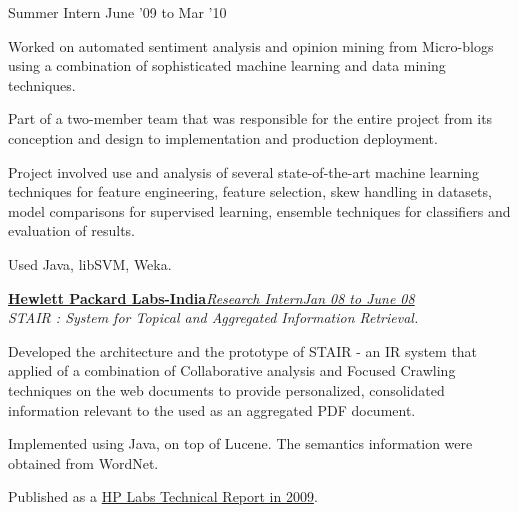 \documentclass[10pt]{article}
\newenvironment{innerlist}[1][\enskip\textbullet]%
        {\begin{compactitem}[#1]}{\end{compactitem}}
\newcommand{\blankline}{\vspace{0.25cm}}
\begin{document}
\begin{innerlist}
\item[] Summer Intern \hfill{June '09 to Mar '10}
        \begin{innerlist}
        \item {Worked on automated sentiment analysis and opinion mining from Micro-blogs using a combination of sophisticated machine learning and data mining techniques.}
        \item {Part of a two-member team that was responsible for the entire project from its conception and design to implementation and production deployment. }
        \item {Project involved use and analysis of several state-of-the-art machine learning techniques for feature engineering, feature selection, skew handling in datasets, model comparisons for supervised learning, ensemble techniques for classifiers and evaluation of results.}
        \item {Used Java, libSVM, Weka.}
        \end{innerlist}
\end{innerlist}

\blankline

\href{http://www.hpl.hp.com/india/}{\textbf{Hewlett Packard Labs-India}\hspace{1cm}\textit{Research Intern}\hfill \textit{Jan 08 to June 08}}\\
\emph{STAIR : System for Topical and Aggregated Information Retrieval.}
       \begin{compactitem}
        \item {Developed the architecture and the prototype of STAIR - an IR system that  applied of a combination of Collaborative analysis and Focused Crawling techniques on the web documents to provide personalized, consolidated information relevant to the used as an aggregated PDF document.}
        
        \item {Implemented using Java, on top of Lucene. The semantics information were obtained from WordNet.}
        \item Published as a \href{http://www.hpl.hp.com/techreports/2009/HPL-2009-51.pdf}{HP Labs Technical Report in 2009}.
       \end{compactitem}

\blankline
\end{document}
